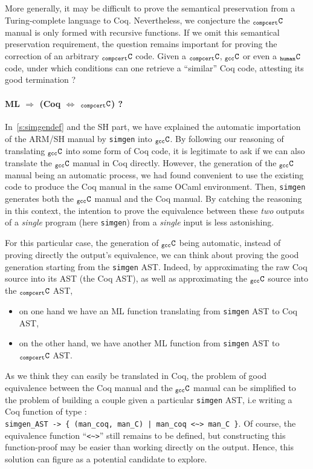 \documentclass[a4paper, 11pt]{article}
\newcommand{\simgen}{{\tt simgen}\xspace}
\newcommand{\C}{$_{\tt compcert}{\tt C}$\xspace}
\newcommand{\gccC}{$_{\tt gcc}{\tt C}$\xspace}
\newcommand{\hC}{$_{\tt human}{\tt C}$\xspace}
\begin{document}
More generally, it may be difficult to prove the semantical preservation from a Turing-complete language to Coq. Nevertheless, we conjecture the \C manual is only formed with recursive functions. If we omit this semantical preservation requirement, the question remains important for proving the correction of an arbitrary \C code. Given a \C, \gccC or even a \hC code, under which conditions can one retrieve a ``similar'' Coq code, attesting its good termination ? 

\paragraph{ML $\Longrightarrow$ (Coq $\Longleftrightarrow$ \C) ?}

In~\ref{s:simgendef} and the SH part, we have explained the automatic importation of the ARM/SH manual by \simgen into \gccC. By following our reasoning of translating \gccC into some form of Coq code, it is legitimate to ask if we can also translate the \gccC manual in Coq directly. However, the generation of the \gccC manual being an automatic process, we had found convenient to use the existing code to produce the Coq manual in the same OCaml environment. Then, \simgen generates both the \gccC manual and the Coq manual. By catching the reasoning in this context, the intention to prove the equivalence between these \emph{two} outputs of a \emph{single} program (here \simgen) from a \emph{single} input is less astonishing. 

For this particular case, the generation of \gccC being automatic, instead of proving directly the output's equivalence, we can think about proving the good generation starting from the \simgen AST. Indeed, by approximating the raw Coq source into its AST (the Coq AST), as well as approximating the \gccC source into the \C AST, 
\begin{itemize}
\item on one hand we have an ML function translating from \simgen AST to Coq AST,
\item on the other hand, we have another ML function from \simgen AST to \C AST.
\end{itemize} 
As we think they can easily be translated in Coq, the problem of good equivalence between the Coq manual and the \gccC manual can be simplified to the problem of building a couple given a particular \simgen AST, i.e writing a Coq function of type : \\
\verb!simgen_AST -> { (man_coq, man_C) | man_coq <~> man_C }!. Of course, the equivalence function ``\verb|<~>|'' still remains to be defined, but constructing this function-proof may be easier than working directly on the output. Hence, this solution can figure as a potential candidate to explore.
\end{document}
